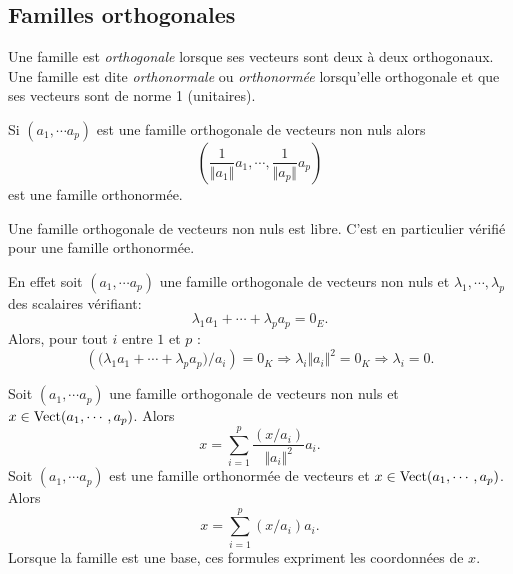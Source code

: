 \clearpage
\subsection{Familles orthogonales}
 \begin{defi}
  Une famille est \emph{orthogonale} lorsque ses vecteurs sont deux à deux orthogonaux. Une famille est dite \emph{orthonormale} ou \emph{orthonormée} lorsqu'elle orthogonale et que ses vecteurs sont de norme 1 (unitaires).
 \end{defi}
\begin{rem}
  Si $(a_1,\cdots a_p)$ est une famille orthogonale de vecteurs non nuls alors 
\begin{displaymath}
 (\frac{1}{\Vert a_1\Vert}a_1,\cdots, \frac{1}{\Vert a_p\Vert}a_p)
\end{displaymath}
est une famille orthonormée.
\end{rem}

\begin{prop}
 Une famille orthogonale de vecteurs non nuls est libre. C'est en particulier vérifié pour une famille orthonormée.
\end{prop}
\begin{demo}
 En effet soit $(a_1,\cdots a_p)$ une famille orthogonale de vecteurs non nuls et $\lambda_1, \cdots, \lambda_p$  des scalaires vérifiant:
\begin{displaymath}
 \lambda_1 a_1 +\cdots +\lambda_p a_p = 0_E .
\end{displaymath}
Alors, pour tout $i$ entre $1$ et $p$ :
\begin{displaymath}
 \left( \bigl(\lambda_1 a_1 +\cdots +\lambda_p a_p\bigr)/a_i\right)  = 0_K\Rightarrow
\lambda_i \Vert a_i\Vert^2=0_K\Rightarrow\lambda_i=0 .
\end{displaymath}
\end{demo}
\begin{prop}
 Soit $(a_1,\cdots a_p)$ une famille orthogonale de vecteurs non nuls et $x\in \mathop{\mathrm{Vect}}(a_1,\cdots,a_p)$. Alors
\begin{displaymath}
 x = \sum_{i=1}^p\frac{(x/a_i)}{\Vert a_i\Vert^2}a_i.
\end{displaymath}
 Soit $(a_1,\cdots a_p)$ est une famille orthonormée de vecteurs et $x\in \mathop{\mathrm{Vect}}(a_1,\cdots,a_p)$. Alors
\begin{displaymath}
 x = \sum_{i=1}^p (x/a_i) a_i .
\end{displaymath}
Lorsque la famille est une base, ces formules expriment les coordonnées de $x$.
\end{prop}

